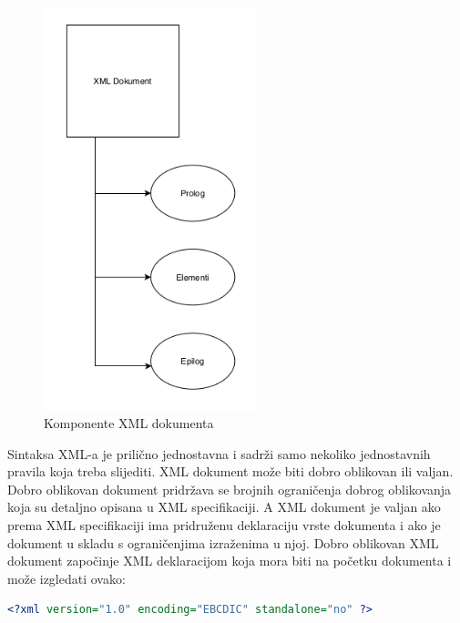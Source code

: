 \documentclass{foi}
\begin{document}
\begin{figure}[h!]
    \centering
    \includegraphics[width=0.55\textwidth]{slike/XMLkomponente.png}
    \caption{Komponente XML dokumenta}
\end{figure}

Sintaksa XML-a je prilično jednostavna i sadrži samo nekoliko jednostavnih pravila koja treba slijediti. XML dokument može biti dobro oblikovan ili valjan. Dobro oblikovan dokument pridržava se brojnih ograničenja dobrog oblikovanja koja su detaljno opisana u XML specifikaciji. A XML dokument je valjan ako prema XML specifikaciji ima pridruženu deklaraciju vrste dokumenta i ako je dokument u skladu s ograničenjima izraženima u njoj. Dobro oblikovan XML dokument započinje XML deklaracijom koja mora biti na početku dokumenta i može izgledati ovako:

\begin{lstlisting}[language=XML]
<?xml version="1.0" encoding="EBCDIC" standalone="no" ?>
\end{lstlisting}
\end{document}
